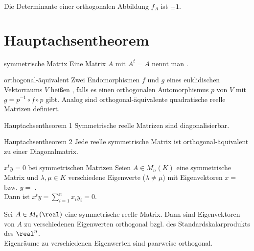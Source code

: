 \begin{Kor}
    Die Determinante einer orthogonalen Abbildung $f_A$ ist $\pm 1$.
\end{Kor}

\section{%
    Hauptachsentheorem%
}

\begin{Def}{symmetrische Matrix}
    Eine Matrix $A$ mit $A^t = A$ nennt man .
\end{Def}

\begin{Def}{orthogonal-äquivalent}
    Zwei Endomorphismen $f$ und $g$ eines euklidischen Vektorraums $V$
    heißen , falls es einen orthogonalen
    Automorphismus $p$ von $V$ mit $g = p^{-1} \circ f \circ p$ gibt.
    Analog sind orthogonal-äquivalente quadratische reelle Matrizen definiert.
\end{Def}

\begin{Satz}{Hauptachsentheorem 1}
    Symmetrische reelle Matrizen sind diagonalisierbar.
\end{Satz}

\begin{Satz}{Hauptachsentheorem 2}
    Jede reelle symmetrische Matrix ist orthogonal-äquivalent zu einer
    Diagonalmatrix.
\end{Satz}

\begin{Satz}{$x^t y = 0$ bei symmetrischen Matrizen}
    Seien $A \in M_n(K)$ eine symmetrische Matrix und $\lambda, \mu \in K$
    verschiedene Eigenwerte ($\lambda \not= \mu$) mit Eigenvektoren
    $x =$  bzw.
    $y =$ . \\
    Dann ist $x^t y = \sum_{i=1}^n x_i y_i = 0$.
\end{Satz}

\begin{Kor}
    Sei $A \in M_n(\real)$ eine symmetrische reelle Matrix.
    Dann sind Eigenvektoren von $A$ zu verschiedenen Eigenwerten orthogonal
    bzgl. des Standardskalarprodukts des $\real^n$. \\
    Eigenräume zu verschiedenen Eigenwerten sind paarweise orthogonal.
\end{Kor}

